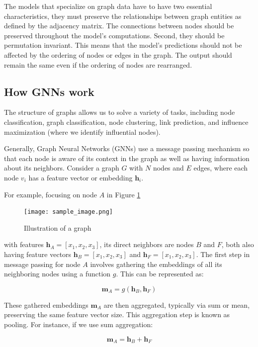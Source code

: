 The models that specialize on graph data have to have two essential characteristics, they  must preserve the relationships between graph entities as defined by the adjacency matrix. The connections between nodes should be preserved throughout the model's computations. Second, they should be permutation invariant. This means that the model's predictions should not be affected by the ordering of nodes or edges in the graph. The output should remain the same even if the ordering of nodes are rearranged\cite{sanchez-lengeling_gentle_2021}. 



\subsection{How GNNs work}
The structure of graphs allows us to solve a variety of tasks, including node classification, graph classification, node clustering, link prediction, and influence maximization (where we identify influential nodes).

Generally, Graph Neural Networks (GNNs) use a message passing mechanism so that each node is aware of its context in the graph as well as having information about its neighbors. Consider a graph \( G \) with \( N \) nodes and \( E \) edges, where each node \( v_i \) has a feature vector or embedding \( \mathbf{h}_i \).

For example, focusing on node \( A \) in Figure \ref{fig:Message passing} 
\begin{figure}[h]
    \centering
    \texttt{[image: sample\_image.png]}
    \caption{Illustration of a graph}
    \label{fig:Message passing}
\end{figure}

with features \( \mathbf{h}_A = [x_1, x_2, x_3] \), its direct neighbors are nodes \( B \) and \( F \), both also having feature vectors \( \mathbf{h}_B = [x_1, x_2, x_3] \) and \( \mathbf{h}_F = [x_1, x_2, x_3] \). The first step in message passing for node \( A \) involves gathering the embeddings of all its neighboring nodes using a function \( g \). This can be represented as:

\[
\mathbf{m}_A = g(\mathbf{h}_B, \mathbf{h}_F)
\]

These gathered embeddings \( \mathbf{m}_A \) are then aggregated, typically via sum or mean, preserving the same feature vector size. This aggregation step is known as pooling. For instance, if we use sum aggregation:

\[
\mathbf{m}_A = \mathbf{h}_B + \mathbf{h}_F
\]


